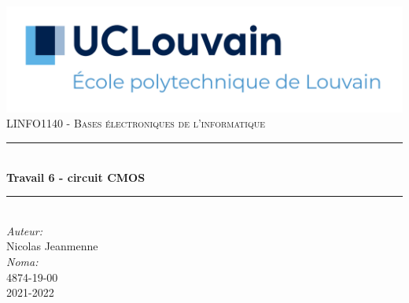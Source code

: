 \begin{titlepage}

    \newcommand{\HRule}{\rule{\linewidth}{0.5mm}} 							%
    \center 
     
    \includegraphics[width=\textwidth]{../pictures/UCLouvain-EPL.png}\\[1cm]
    
    \textsc{\large 
    LINFO1140 - Bases électroniques de l'informatique}\\[1cm] 										%
    \HRule \\[0.8cm]
    {\huge \bfseries Travail 6 - circuit CMOS}\\[0.7cm]								%
    \HRule \\[2cm]
    \large
    \emph{Auteur:}\\
    Nicolas Jeanmenne\\[1.5cm]
    \emph{Noma:}\\
    4874-19-00\\[1.5cm]
    \vfill													%
    {\large 2021-2022}\\[5cm] 	%
    
    \vfill
\end{titlepage}